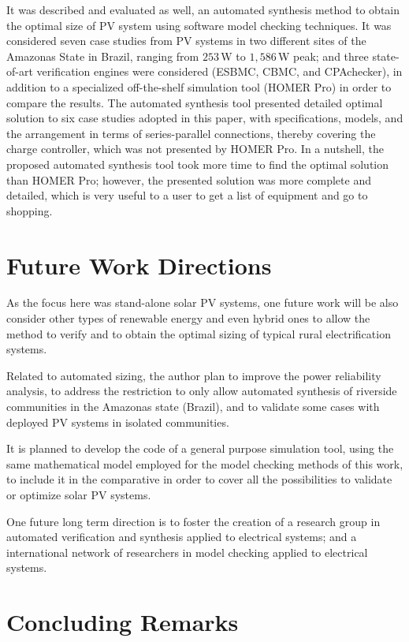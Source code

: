 It was described and evaluated as well, an automated synthesis method to obtain the optimal size of PV system using software model checking techniques. It was considered seven case studies from PV systems in two different sites of the Amazonas State in Brazil, ranging from $253$\,W to $1,586$\,W peak; and three state-of-art verification engines were considered (ESBMC, CBMC, and CPAchecker), in addition to a specialized off-the-shelf simulation tool (HOMER Pro) in order to compare the results. The automated synthesis tool presented detailed optimal solution to six case studies adopted in this paper, with specifications, models, and the arrangement in terms of series-parallel connections, thereby covering the charge controller, which was not presented by HOMER Pro. In a nutshell, the proposed automated synthesis tool took more time to find the optimal solution than HOMER Pro; however, the presented solution was more complete and detailed, which is very useful to a user to get a list of equipment and go to shopping.


\section{Future Work Directions}

As the focus here was stand-alone solar PV systems, one future work will be also consider other types of renewable energy and even hybrid ones to allow the method to verify and to obtain the optimal sizing of typical rural electrification systems.

Related to automated sizing, the author plan to improve the power reliability analysis, 
to address the restriction to only allow automated synthesis of riverside communities in the Amazonas state (Brazil), and to validate some cases with deployed PV systems in isolated communities.

It is planned to develop the code of a general purpose simulation tool, using the same mathematical model employed for the model checking methods of this work, to include it in the comparative in order to cover all the possibilities to validate or optimize solar PV systems.

One future long term direction is to foster the creation of a research group in automated verification and synthesis applied to electrical systems; and a international network of researchers in model checking applied to electrical systems.


\section{Concluding Remarks}

